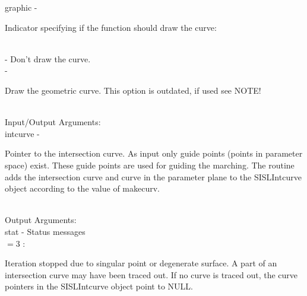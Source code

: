         \>\>    {\fov graphic}\> - \>   \begin{minipg2}
                                Indicator specifying if the function
                                should draw the curve:
                                \end{minipg2}\\
                \>\>\>\> -     \>Don't draw the curve.\\
                \>\>\>\> -     \>\begin{minipg5}
                                        Draw the geometric curve. This option is
                                        outdated, if used see NOTE!
                                        \end{minipg5} \\[0.8ex]
        \>Input/Output Arguments:\\
        \>\>    {\fov intcurve}\> - \>  \begin{minipg2}
                                Pointer to the intersection curve.
                                As input only
                                guide points (points in parameter space)
                                exist. These guide points
                                are used for guiding the marching.
                                The routine adds the
                                intersection curve and curve in the parameter
                                plane to the SISLIntcurve object according to the value
                                of makecurv.
                                \end{minipg2}\\[0.8ex]
        \>Output Arguments:\\
        \>\>    {\fov stat}     \> - \> Status messages\\
                \>\>\>\>\>      $= 3$ : \>      \begin{minipg5}
                                                Iteration stopped due to singular
                                                point or degenerate surface. A part of
                                                an intersection curve may have been
                                                traced out. If no curve is traced out,
                                                the curve pointers in the SISLIntcurve
                                                object point to NULL.
                                                \end{minipg5} \\[0.3ex]
